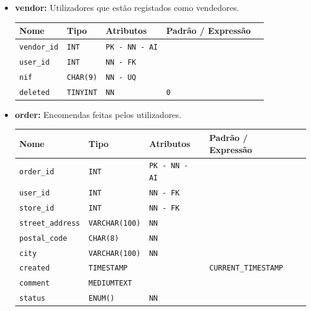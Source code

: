 \begin{itemize}
    \item \textbf{vendor:}
    Utilizadores que estão registados como vendedores.
    \begin{table}[H]
        \centering
        \begin{tabularx}{\linewidth}{XXXXX}
        \toprule
        \textbf{\color{color_scheme}Nome} & \textbf{\color{color_scheme}Tipo} & \textbf{\color{color_scheme}Atributos} & \textbf{\color{color_scheme}Padrão / Expressão}\\
        \midrule
        \texttt{vendor\_id} & \texttt{INT} & \texttt{PK - NN - AI} &\\
        \texttt{user\_id} & \texttt{INT} & \texttt{NN - FK} & \\
        \texttt{nif} & \texttt{CHAR(9)} & \texttt{NN - UQ} & \\
        \texttt{deleted} & \texttt{TINYINT}  & \texttt{NN}  & \texttt{0} \\
        \bottomrule
        \end{tabularx}
        \label{table: vendor}
    \end{table}

    \item \textbf{order:}
    Encomendas feitas pelos utilizadores. 
    \begin{table}[H]
        \centering
        \begin{tabularx}{\linewidth}{XXXXX}
        \toprule
        \textbf{\color{color_scheme}Nome} & \textbf{\color{color_scheme}Tipo} & \textbf{\color{color_scheme}Atributos} & \textbf{\color{color_scheme}Padrão / Expressão}\\
        \midrule
        \texttt{order\_id} & \texttt{INT} & \texttt{PK - NN - AI} &\\
        \texttt{user\_id} & \texttt{INT}  & \texttt{NN - FK}  &  \\
        \texttt{store\_id} & \texttt{INT}  & \texttt{NN - FK}  &  \\
        \texttt{street\_address} & \texttt{VARCHAR(100)}  & \texttt{NN}  & \\
        \texttt{postal\_code} & \texttt{CHAR(8)}  & \texttt{NN}  & \\
        \texttt{city} & \texttt{VARCHAR(100)}  & \texttt{NN}  & \\
        \texttt{created} & \texttt{TIMESTAMP}  &  & \texttt{CURRENT\_TIMESTAMP}\\
        \texttt{comment} & \texttt{MEDIUMTEXT}  &  & \\
        \texttt{status} & \texttt{ENUM()}  & \texttt{NN}  &  \\
        \bottomrule
        \end{tabularx}
        \label{table: order}
    \end{table}


\end{itemize}
